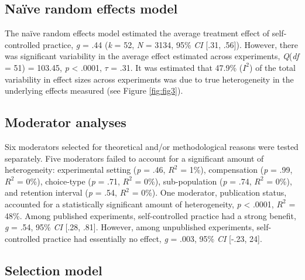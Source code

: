 \documentclass[
  english,
  man,floatsintext]{apa7}
\begin{document}
\hypertarget{nauxefve-random-effects-model}{%
\subsection{Naïve random effects model}\label{nauxefve-random-effects-model}}

The naïve random effects model estimated the average treatment effect of self-controlled practice, \emph{g} = .44 (\emph{k} = 52, \emph{N} = 3134, 95\% \emph{CI} {[}.31, .56{]}). However, there was significant variability in the average effect estimated across experiments, \emph{Q}(\emph{df} = 51) = 103.45, \emph{p} \textless{} .0001, \(\tau\) = .31. It was estimated that 47.9\% (\(I^2\)) of the total variability in effect sizes across experiments was due to true heterogeneity in the underlying effects measured (see Figure \ref{fig:fig3}).

\hypertarget{moderator-analyses-1}{%
\subsection{Moderator analyses}\label{moderator-analyses-1}}

Six moderators selected for theoretical and/or methodological reasons were tested separately. Five moderators failed to account for a significant amount of heterogeneity: experimental setting (\emph{p} = .46, \(R^2\) = 1\%), compensation (\emph{p} = .99, \(R^2\) = 0\%), choice-type (\emph{p} = .71, \(R^2\) = 0\%), sub-population (\emph{p} = .74, \(R^2\) = 0\%), and retention interval (\emph{p} = .54, \(R^2\) = 0\%). One moderator, publication status, accounted for a statistically significant amount of heterogeneity, \emph{p} \textless{} .0001, \(R^2\) = 48\%. Among published experiments, self-controlled practice had a strong benefit, \emph{g} = .54, 95\% \emph{CI} {[}.28, .81{]}. However, among unpublished experiments, self-controlled practice had essentially no effect, \emph{g} = .003, 95\% \emph{CI} {[}-.23, 24{]}.

\hypertarget{selection-model}{%
\subsection{Selection model}\label{selection-model}}
\end{document}
